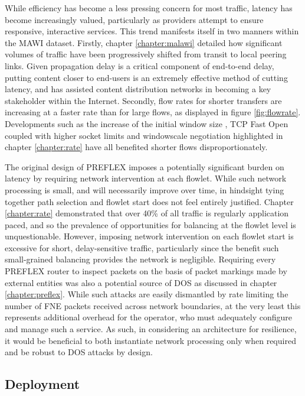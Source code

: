 While efficiency has become a less pressing concern for most traffic, latency has become increasingly valued, particularly as providers attempt to ensure responsive, interactive services.
This trend manifests itself in two manners within the \ac{MAWI} dataset.
Firstly, chapter \ref{chapter:malawi} detailed how significant volumes of traffic have been progressively shifted from transit to local peering links.
Given propagation delay is a critical component of end-to-end delay, putting content closer to end-users is an extremely effective method of cutting latency, and has assisted content distribution networks in becoming a key stakeholder within the Internet.
Secondly, flow rates for shorter transfers are increasing at a faster rate than for large flows, as displayed in figure \ref{fig:flowrate}.
Developments such as the increase of the initial window size \cite{Dukkipati:2010p160}, \ac{TCP} Fast Open \cite{Radhakrishnan:2011:TFO:2079296.2079317} coupled with higher socket limits and windowscale negotiation highlighted in chapter \ref{chapter:rate} have all benefited shorter flows disproportionately.

The original design of \ac{PREFLEX} imposes a potentially significant burden on latency by requiring network intervention at each flowlet.
While such network processing is small, and will necessarily improve over time, in hindsight tying together path selection and flowlet start does not feel entirely justified.
Chapter \ref{chapter:rate} demonstrated that over 40\% of all traffic is regularly application paced, and so the prevalence of opportunities for balancing at the flowlet level is unquestionable.
However, imposing network intervention on each flowlet start is excessive for short, delay-sensitive traffic, particularly since the benefit such small-grained balancing provides the network is negligible.
Requiring every \ac{PREFLEX} router to inspect packets on the basis of packet markings made by external entities was also a potential source of \acf{DOS} as discussed in chapter \ref{chapter:preflex}.
While such attacks are easily dismantled by rate limiting the number of \ac{FNE} packets received across network boundaries, at the very least this represents additional overhead for the operator, who must adequately configure and manage such a service.
As such, in considering an architecture for resilience, it would be beneficial to both instantiate network processing only when required and be robust to \ac{DOS} attacks by design.

\subsection{Deployment}

